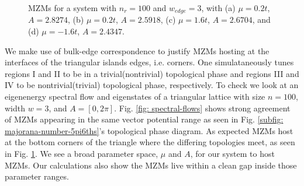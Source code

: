 \documentclass[aps,prb,showpacs,amsmath,twocolumn,amssymb,superscriptaddress]{revtex4-2}
\begin{document}
\begin{figure}[]
  \hfill
  \hfill
  \hfill
  \hfill
  \caption{MZMs for a system with $n_r=100$ and $w_{edge}=3$, with (a) $\mu=0.2t$, $A = 2.8274$, (b) $\mu=0.2t$, $A = 2.5918$, (c) $\mu=1.6t$, $A = 2.6704$, and (d) $\mu=-1.6t$, $A = 2.4347$.}
  \label{fig: mzm-wavefunctions}
\end{figure}

We make use of bulk-edge correspondence to justify MZMs hosting at the interfaces of the triangular islands edges, i.e. corners.
One simulataneously tunes regions I and II to be in a trivial(nontrivial) topological phase and regions III and IV to be nontrivial(trivial) topological phase, respectively.
To check we look at an eigenenergy spectral flow and eigenstates of a triangular lattice with size $n=100$, width $w=3$, and $A = [0,2\pi]$.
Fig. \ref{fig: spectral-flows} shows strong agreement of MZMs appearing in the same vector potential range as seen in Fig. \ref{subfig: majorana-number-5pi6ths}'s topological phase diagram.
As expected MZMs host at the bottom corners of the triangle where the differing topologies meet, as seen in Fig. \ref{fig: mzm-wavefunctions}.
We see a broad parameter space, $\mu$ and $A$, for our system to host MZMs.
Our calculations also show the MZMs live within a clean gap inside those parameter ranges.
\end{document}
